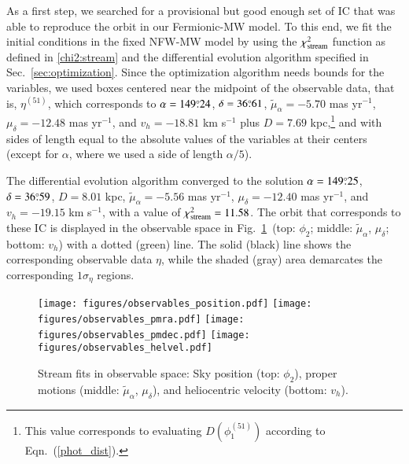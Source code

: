 \documentclass[referee]{aa} %
\begin{document}
As a first step, we searched for a provisional but good enough set of IC that was able to reproduce the orbit in our
Fermionic-MW model. To this end, we fit the initial conditions in the fixed NFW-MW model by using the $\chi^2_{\rm{stream}}$ function as defined in \cref{chi2:stream}
and the differential evolution algorithm specified in Sec.~\ref{sec:optimization}. Since the optimization algorithm
needs bounds for the variables, we used boxes centered near the midpoint
of the observable data, that is, $\eta^{(51)}$, which corresponds to $\alpha=149\overset{\circ}{.} 24$, $\delta=36\overset{\circ}{.} 61$, $\tilde{\mu}_\alpha=-5.70$ mas yr$^{-1}$, $\mu_\delta=-12.48$ mas yr$^{-1}$, and $v_h=-18.81$ km s$^{-1}$
plus $D=7.69$ kpc,\footnote{This value corresponds to evaluating $D(\phi_1^{(51)})$ according to Eqn.~(\ref{phot_dist}).} and with sides of length equal to the absolute values of the variables at their centers (except for $\alpha$, where we used a side of length $\alpha/5$).

The differential evolution algorithm converged to the solution
$\alpha=149\overset{\circ}{.} 25$, $\delta=36\overset{\circ}{.} 59$, $D=8.01$ kpc, $\tilde{\mu}_\alpha=-5.56$ mas yr$^{-1}$, $\mu_\delta=-12.40$ mas yr$^{-1}$, and $v_h=-19.15$ km s$^{-1}$, with a value of $\chi^2_{\rm{stream}}= 11.58$.
The orbit that corresponds to these IC is displayed in the observable space in Fig.~\ref{fig:obs_astrometry}~(top: $\phi_2$; middle: $\tilde{\mu}_\alpha$, $\mu_\delta$; bottom: $v_h$) with a dotted (green) line. The solid (black) line shows the corresponding observable data $\eta$, while the shaded (gray) area demarcates the corresponding $1\sigma_\eta$ regions.
\begin{figure}
   \centering
   \texttt{[image: figures/observables\_position.pdf]}
   \texttt{[image: figures/observables\_pmra.pdf]}
   \texttt{[image: figures/observables\_pmdec.pdf]}
   \texttt{[image: figures/observables\_helvel.pdf]}
   \caption{Stream fits in observable space: Sky position (top: $\phi_2$), proper motions (middle: $\tilde{\mu}_\alpha$, $\mu_\delta$), and heliocentric velocity (bottom: $v_h$).}
   \label{fig:obs_astrometry}
\end{figure}
\end{document}
